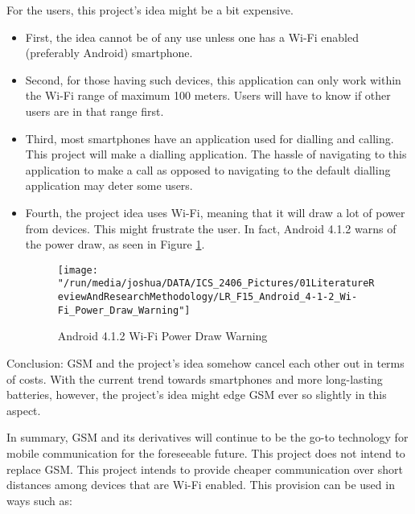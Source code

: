 \documentclass[12pt,svgnames,smaller]{article} %
\begin{document}
\begin{itemize}
\begin{itemize}
			For the users, this project’s idea might be a bit expensive. 
			
			\begin{itemize}
				\item First, the idea cannot be of any use unless one has a Wi-Fi enabled (preferably Android) smartphone. 
				\item Second, for those having such devices, this application can only work within the Wi-Fi range of maximum 100 meters. Users will have to know if other users are in that range first. 
				\item Third, most smartphones have an application used for dialling and calling. This project will make a dialling application. The hassle of navigating to this application to make a call as opposed to navigating to the default dialling application may deter some users.
				\item Fourth, the project idea uses Wi-Fi, meaning that it will draw a lot of power from devices. This might frustrate the user. In fact, Android 4.1.2 warns of the power draw, as seen in Figure \ref{fig:LiteratureReview-Figure15}.
				
				\begin{figure}
					\centering
					\texttt{[image: "/run/media/joshua/DATA/ICS\_2406\_Pictures/01LiteratureReviewAndResearchMethodology/LR\_F15\_Android\_4-1-2\_Wi-Fi\_Power\_Draw\_Warning"]}
					\caption{Android 4.1.2 Wi-Fi Power Draw Warning}
					\label{fig:LiteratureReview-Figure15}
				\end{figure}
				
			\end{itemize}
			
		\end{itemize}
		
		Conclusion: GSM and the project’s idea somehow cancel each other out in terms of costs. With the current trend towards smartphones and more long-lasting batteries, however, the project’s idea might edge GSM ever so slightly in this aspect.
		
		
	\end{itemize}
	
	In summary, GSM and its derivatives will continue to be the go-to technology for mobile communication for the foreseeable future. This project does not intend to replace GSM. This project intends to provide cheaper communication over short distances among devices that are Wi-Fi enabled. This provision can be used in ways such as:
	
\end{document}
